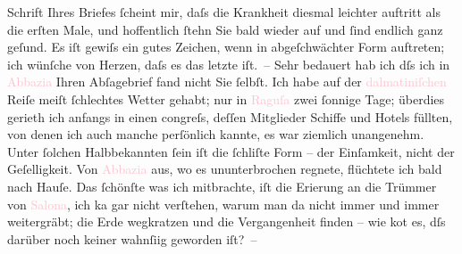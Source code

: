                Schrift Ihres Briefes ſcheint mir, daſs die Krankheit diesmal leichter auftritt als
               die erſten Male, und hoffentlich ſtehn Sie bald wieder auf und ſind endlich ganz
               geſund. Es iſt gewiſs ein gutes Zeichen, wenn \label{K_L01034_2v}\label{K_L01034_2h} in abgeſchwächter Form auftreten; {\pb}ich wünſche von Herzen, daſs es das letzte iſt. –
               Sehr bedauert hab ich dſs ich in \textcolor{pink}{Abbazia}{}\ledrightnote{\textcolor{pink}{Opatija}} Ihren
               Abſagebrief fand nicht Sie ſelbſt. Ich habe auf der \textcolor{pink}{dalmatiniſchen}{}\ledrightnote{\textcolor{pink}{Dalmatien}} Reiſe meiſt ſchlechtes Wetter gehabt; nur in \textcolor{pink}{Raguſa}{}\ledrightnote{\textcolor{pink}{Dubrovnik}} zwei ſonnige Tage; überdies gerieth ich anfangs in einen
                  \label{K_L01034_3v}\label{K_L01034_3h}congreſs, deſſen Mitglieder Schiffe und Hotels füllten, von
               denen ich auch manche perſönlich kannte, es war ziemlich unangenehm. Unter ſolchen
                  Halb{\pb}bekannten ſein iſt die ſchli{\geminationm}ſte Form – der Einſamkeit, nicht der Geſelligkeit. Von
                  \textcolor{pink}{Abbazia}{}\ledrightnote{\textcolor{pink}{Opatija}} aus, wo es ununterbrochen regnete,
               flüchtete ich bald nach Hauſe. Das ſchönſte was ich mitbrachte, iſt die Eri{\geminationn}erung an die Trümmer von \textcolor{pink}{Salona}{}\ledrightnote{\textcolor{pink}{Solin}}, ich ka{\geminationn} gar nicht verſtehen, warum man
               da nicht immer und immer weitergräbt; die Erde wegkratzen und die Vergangenheit
               finden – wie ko{\geminationm}t es, dſs darüber noch keiner wahnſi{\geminationn}ig {\pb}geworden
               iſt? –\pend
           \pstart
